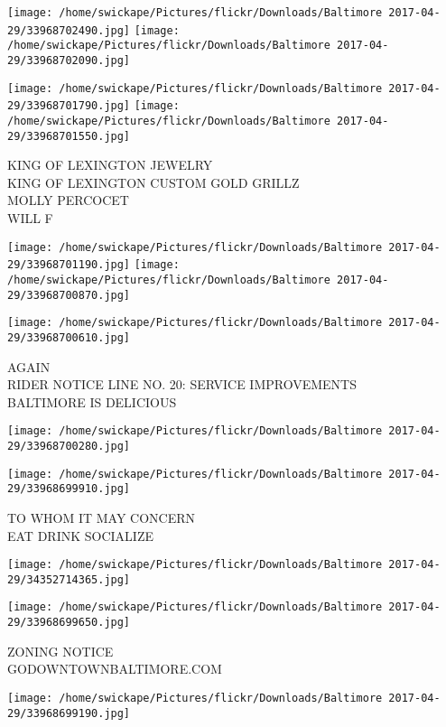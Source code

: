 \documentclass[10pt,letterpaper]{article}
\begin{document}
\texttt{[image: /home/swickape/Pictures/flickr/Downloads/Baltimore 2017-04-29/33968702490.jpg]}
\texttt{[image: /home/swickape/Pictures/flickr/Downloads/Baltimore 2017-04-29/33968702090.jpg]}

\texttt{[image: /home/swickape/Pictures/flickr/Downloads/Baltimore 2017-04-29/33968701790.jpg]}
\texttt{[image: /home/swickape/Pictures/flickr/Downloads/Baltimore 2017-04-29/33968701550.jpg]}

KING OF LEXINGTON JEWELRY\\
KING OF LEXINGTON CUSTOM GOLD GRILLZ\\
MOLLY PERCOCET\\
WILL F
\pagebreak

\texttt{[image: /home/swickape/Pictures/flickr/Downloads/Baltimore 2017-04-29/33968701190.jpg]}
\texttt{[image: /home/swickape/Pictures/flickr/Downloads/Baltimore 2017-04-29/33968700870.jpg]}

\vspace{0.25in}
\texttt{[image: /home/swickape/Pictures/flickr/Downloads/Baltimore 2017-04-29/33968700610.jpg]}

AGAIN\\
RIDER NOTICE LINE NO. 20: SERVICE IMPROVEMENTS\\
BALTIMORE IS DELICIOUS
\pagebreak

\texttt{[image: /home/swickape/Pictures/flickr/Downloads/Baltimore 2017-04-29/33968700280.jpg]}

\vspace{0.25in}
\texttt{[image: /home/swickape/Pictures/flickr/Downloads/Baltimore 2017-04-29/33968699910.jpg]}

TO WHOM IT MAY CONCERN\\
EAT DRINK SOCIALIZE
\pagebreak

\texttt{[image: /home/swickape/Pictures/flickr/Downloads/Baltimore 2017-04-29/34352714365.jpg]}

\vspace{0.25in}
\texttt{[image: /home/swickape/Pictures/flickr/Downloads/Baltimore 2017-04-29/33968699650.jpg]}

ZONING NOTICE\\
GODOWNTOWNBALTIMORE.COM
\pagebreak

\texttt{[image: /home/swickape/Pictures/flickr/Downloads/Baltimore 2017-04-29/33968699190.jpg]}
\end{document}
